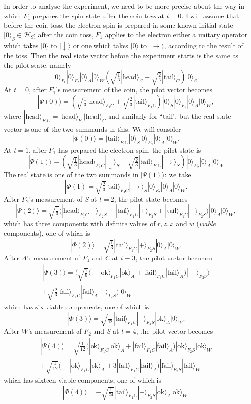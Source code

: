 \documentclass[12pt,a4paper,reqno]{article}
\newcommand{\head}{\text{head}}
\newcommand{\tail}{\text{tail}}
\newcommand{\ok}{\text{ok}}
\newcommand{\fail}{\text{fail}}
\renewcommand{\(}{\left(}
\renewcommand{\)}{\right)}
\renewcommand{\.}{\centerdot}
\newcommand{\1}{\mathbf{1}}
\renewcommand{\H}{\mathcal{H}}
\newcommand{\<}{\langle}
\renewcommand{\>}{\rangle}
\newcommand{\third}{\tfrac{1}{3}}
\theoremstyle{definition}
\theoremstyle{remark}
\numberwithin{equation}{section}
\begin{document}
  In order to analyse the experiment, we need to be more precise about the way in which $F_1$ prepares the spin state after the coin toss at $t = 0$. I will assume that before the coin toss, the electron spin is prepared in some known initial state $|0\>_S\in\H_S$; after the coin toss, $F_1$ applies to the electron either a unitary operator which takes $|0\>$ to $|\downarrow\>$ or one which takes $|0\>$ to $|\rightarrow\>$, according to the result of the toss. Then the real state vector before the experiment starts is the same as the pilot state, namely
\[
 |0\>_{F_1}|0\>_{F_2}|0\>_A|0\>_W\(\sqrt{\third}|\head\>_C + \sqrt{\tfrac{2}{3}}|\tail\>_C\)|0\>_S. 
\]
  	At $t=0$, after $F_1$'s measurement of the coin, the pilot vector becomes 
\[
|\Psi(0)\> = \left(\sqrt{\third}|\head\>_{F_1C} + \sqrt{\tfrac{2}{3}}|\tail\>_{F_1C}\right)|0\>_S|0\>_{F_2}|0\>_A|0\>_W,
\]
where $|\head\>_{F_1C} = |\head\>_{F_1}|\head\>_C$ and similarly for ``tail",
but the real state vector is one of the two summands in this. We will consider
\[
|\Phi(0)\> = |\tail\>_{F_1C}|0\>_S|0\>_{F_2}|0\>_A|0\>_W.
\]
At $t =1$, after $F_1$ has prepared the electron spin, the pilot state is
\[
|\Psi(1)\> = \left(\sqrt{\third}|\head\>_{F_1C}|\downarrow\>_S + \sqrt{\tfrac{2}{3}}|\tail\>_{F_1C}|\rightarrow\>_S\right)|0\>_{F_2}|0\>_A|0\>_W
\]
The real state is one of the two summands in $|\Psi(1)\>$; we take
\[
|\Phi(1) = \sqrt{\tfrac{2}{3}}|\tail\>_{F_1C}|\rightarrow\>_S|0\>_{F_2}|0\>_A|0\>_W.
\]
After $F_2$'s measurement of $S$ at $t = 2$, the pilot state becomes
\[
|\Psi(2)\> = \sqrt{\tfrac{1}{3}}\bigg(|\head\>_{F_1C}|-\>_{F_2S} + |\tail\>_{F_1C}|+\>_{F_2S} + 
|\tail\>_{F_1C}|-\>_{F_2S}\bigg)|0\>_A|0\>_W,
\]
which has three components with definite values of $r, z, x$ and $w$ (\emph{viable} components), one of which is
\[
|\Phi(2)\> = \sqrt{\tfrac{1}{3}}|\tail\>_{F_1C}|+\>_{F_2S}|0\>_A|0\>_W.
\]
After $A$'s measurement of $F_1$ and $C$ at $t = 3$, the pilot vector becomes
\begin{multline*}
|\Psi(3)\> = \bigg(\sqrt{\tfrac{1}{6}}\Big( - |\ok\>_{F_1C}|\ok\>_A + |\fail\>_{F_1C}|\fail\>_A\Big)|+\>_{F_2S}\>\\
+ \sqrt{\tfrac{2}{3}}|\fail\>_{F_1C}|\fail\>_A|-\>_{F_2S}\bigg)|0\>_W
\end{multline*}
which has six viable components, one of which is
\[
|\Phi(3)\> = \sqrt{\tfrac{1}{12}}|\tail\>_{F_1C}|+\>_{F_2S}|\ok\>_A|0\>_W.
\]
After $W$'s measurement of $F_2$ and $S$ at $t = 4$, the pilot vector becomes
\begin{multline*}
|\Psi(4)\> = \sqrt{\tfrac{1}{12}}\Big(|\ok\>_{F_1C}|\ok\>_A + |\fail\>_{F_1C}|\fail\>_A\Big)|\ok\>_{F_2S}|\ok\>_W\\
+ \sqrt{\tfrac{1}{12}}\Big(- |\ok\>_{F_1C}|\ok\>_A + 3|\fail\>_{F_1C}|\fail\>_A\Big)|\fail\>_{F_2S}|\fail\>_W
\end{multline*}
which has sixteen viable components, one of which is
\[
|\Phi(4)\> = -\sqrt{\tfrac{1}{24}}|\tail\>_{F_1C}|-\>_{F_2S}|\ok\>_A|\ok\>_W.
\]
\end{document}
